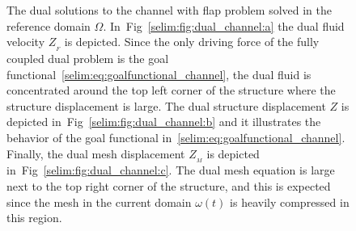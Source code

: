 \begin{figure}
  \label{selim:fig:dual_channel}
\caption{The dual solutions to the channel with flap problem solved in
  the reference domain $\Omega$. In~Fig~\ref{selim:fig:dual_channel:a}
  the dual fluid velocity $Z_{_{F}}$ is depicted. Since the only
  driving force of the fully coupled dual problem is the goal
  functional~\ref{selim:eq:goalfunctional_channel}, the dual fluid is
  concentrated around the top left corner of the structure where the
  structure displacement is large. The dual structure displacement $Z$
  is depicted in~Fig~\ref{selim:fig:dual_channel:b} and it illustrates
  the behavior of the goal functional
  in~\ref{selim:eq:goalfunctional_channel}. Finally, the dual mesh
  displacement $Z_{_{M}}$ is depicted
  in~Fig~\ref{selim:fig:dual_channel:c}. The dual mesh equation is
  large next to the top right corner of the structure, and this is
  expected since the mesh in the current domain $\omega(t)$ is heavily
  compressed in this region.}

\end{figure}
